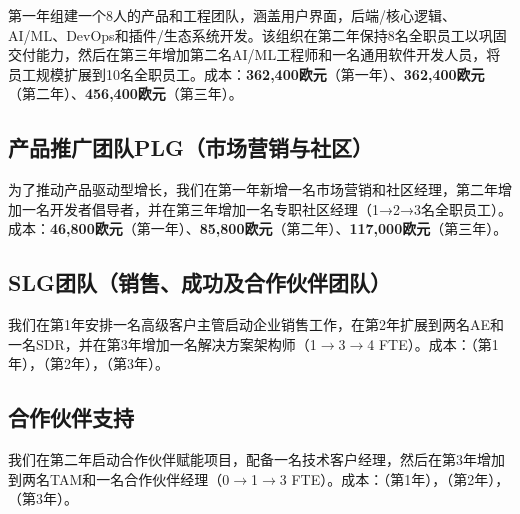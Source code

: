 \documentclass[11点, A4纸, 单面]{article}
\begin{document}
第一年组建一个8人的产品和工程团队，涵盖用户界面，后端/核心逻辑、AI/ML、DevOps和插件/生态系统开发。该组织在第二年保持8名全职员工以巩固交付能力，然后在第三年增加第二名AI/ML工程师和一名通用软件开发人员，将员工规模扩展到10名全职员工。成本：\textbf{362,400欧元}（第一年）、\textbf{362,400欧元}（第二年）、\textbf{456,400欧元}（第三年）。

\subsection{产品推广团队PLG（市场营销与社区）}

为了推动产品驱动型增长，我们在第一年新增一名市场营销和社区经理，第二年增加一名开发者倡导者，并在第三年增加一名专职社区经理（1→2→3名全职员工）。成本：\textbf{46,800欧元}（第一年）、\textbf{85,800欧元}（第二年）、\textbf{117,000欧元}（第三年）。



\subsection{SLG团队（销售、成功及合作伙伴团队）}
我们在第1年安排一名高级客户主管启动企业销售工作，在第2年扩展到两名AE和一名SDR，并在第3年增加一名解决方案架构师（1$\rightarrow$3$\rightarrow$4 FTE）。成本：\textbf{}（第1年），\textbf{}（第2年），\textbf{}（第3年）。

\subsection{合作伙伴支持}
我们在第二年启动合作伙伴赋能项目，配备一名技术客户经理，然后在第3年增加到两名TAM和一名合作伙伴经理（0$\rightarrow$1$\rightarrow$3 FTE）。成本：\textbf{}（第1年），\textbf{}（第2年），\textbf{}（第3年）。
\end{document}
